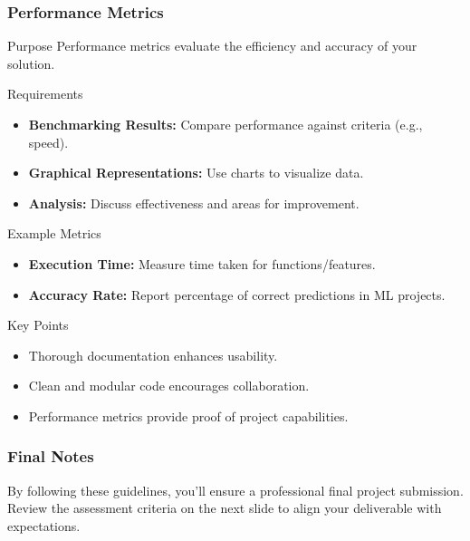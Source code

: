 \documentclass[aspectratio=169]{beamer}
\begin{document}
\begin{frame}
    \frametitle{Performance Metrics}
    \begin{block}{Purpose}
        Performance metrics evaluate the efficiency and accuracy of your solution.
    \end{block}
    
    \begin{block}{Requirements}
        \begin{itemize}
            \item \textbf{Benchmarking Results:} Compare performance against criteria (e.g., speed).
            \item \textbf{Graphical Representations:} Use charts to visualize data.
            \item \textbf{Analysis:} Discuss effectiveness and areas for improvement.
        \end{itemize}
    \end{block}
    
    \begin{block}{Example Metrics}
        \begin{itemize}
            \item \textbf{Execution Time:} Measure time taken for functions/features.
            \item \textbf{Accuracy Rate:} Report percentage of correct predictions in ML projects.
        \end{itemize}
    \end{block}
    
    \begin{block}{Key Points}
        \begin{itemize}
            \item Thorough documentation enhances usability.
            \item Clean and modular code encourages collaboration.
            \item Performance metrics provide proof of project capabilities.
        \end{itemize}
    \end{block}
\end{frame}

\begin{frame}
    \frametitle{Final Notes}
    By following these guidelines, you'll ensure a professional final project submission. Review the assessment criteria on the next slide to align your deliverable with expectations.
\end{frame}
\end{document}
